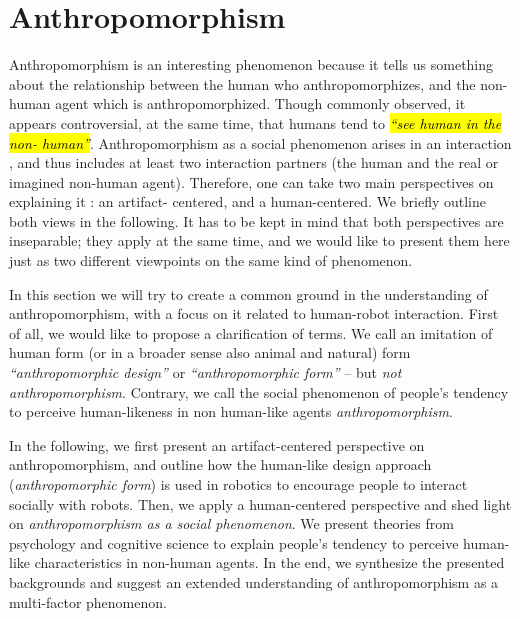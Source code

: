 \documentclass{frontiersSCNS} %
\begin{document}
%
%
%
%
%
%
%
%
%

\section{Anthropomorphism}
\label{sec:anthropomorphism}

Anthropomorphism is an interesting phenomenon because it tells us something about 
the relationship between the human who anthropomorphizes, and the non-human agent 
which is anthropomorphized. Though commonly observed, it appears controversial, at 
the same time, that humans tend to \hl{\textit{``see human in the non-
human''}}. 
Anthropomorphism as a social phenomenon arises in an interaction 
\citep{persson_anthropomorphism_2000}, and thus includes at least two interaction 
partners (the human and the real or imagined non-human agent). Therefore, one can 
take two main perspectives on explaining it \citep{lee_human_2005}: an artifact-
centered, and a human-centered. We briefly outline both views in the following. 
It has to be kept in mind that both perspectives are inseparable; they apply at the 
same time, and we would like to present them here just as two different viewpoints 
on the same kind of phenomenon.

In this section we will try to create a common ground in the understanding of 
anthropomorphism, with a focus on it related to human-robot interaction. 
First of all, we would like to propose a clarification of terms.
We call an imitation of human form (or in a broader sense also animal and natural) 
form \textit{``anthropomorphic design''} or \textit{``anthropomorphic form''} -- 
but \textit{not anthropomorphism}. Contrary, we call the social phenomenon of 
people's tendency to perceive human-likeness in non human-like 
agents \textit{anthropomorphism}.

In the following, we first present an artifact-centered perspective on 
anthropomorphism, and outline how the human-like 
design approach (\textit{anthropomorphic form}) is used in robotics to encourage 
people to interact socially with robots. Then, we apply a human-centered 
perspective and shed light on \textit{anthropomorphism as a social phenomenon}. We present 
theories from psychology and cognitive science to explain people's tendency to 
perceive human-like characteristics in non-human agents. In the end, we synthesize 
the presented backgrounds and suggest an extended understanding of anthropomorphism 
as a multi-factor phenomenon.
\end{document}
